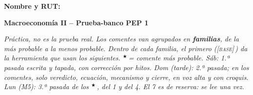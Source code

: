 \documentclass[12pt,letterpaper]{article}
\newif\ifpauta
\newcommand{\estrella}{$^\bigstar$\,}
\newcommand{\base}{\textsc{[base]}\,}
\begin{document}
\textbf{Nombre y RUT:}\\[0.3em]
\framebox[\linewidth]{\rule{0pt}{1.4cm}}

\begin{center}
{\Large\textbf{Macroeconomía II -- Prueba-banco PEP 1}}\ifpauta\\[0.2em]{\large\textbf{Pauta}}\fi
\end{center}

{\small\textit{Práctica, no es la prueba real. Los comentes van agrupados en \textbf{familias}, de la más probable a la menos probable. Dentro de cada familia, el primero (\base) da la herramienta que usan los siguientes. \estrella = comente más probable. Sáb: 1.ª pasada escrita y tapada, con corrección por hitos. Dom (tarde): 2.ª pasada; en los comentes, solo veredicto, ecuación, mecanismo y cierre, en voz alta y con croquis. Lun (M5): 3.ª pasada de los \estrella, del 1 y del 4. El 7 es de reserva: se lee una vez.}}

\end{document}
